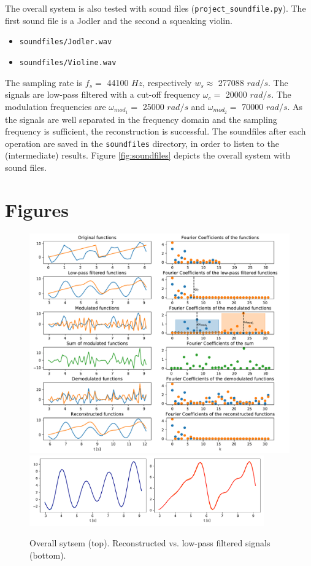 \documentclass[12pt, a4paper]{report}
\begin{document}
The overall system is also tested with sound files (\texttt{project\_soundfile.py}).
The first sound file is a Jodler and the second a squeaking violin.
\begin{itemize}
	\item \texttt{soundfiles/Jodler.wav}
	\item \texttt{soundfiles/Violine.wav}
\end{itemize}
The sampling rate is \(f_s=\) 44100 \(Hz\), respectively \(w_s\approx\) 277088 \(rad/s\).
The signals are low-pass filtered with a cut-off frequency \(\omega_c=\) 20000 \(rad/s\).
The modulation frequencies are \(\omega_{mod_1}=\) 25000 \(rad/s\) and \(\omega_{mod_2}=\) 70000 \(rad/s\).
As the signals are well separated in the frequency domain
and the sampling frequency is sufficient,
the reconstruction is successful.
The soundfiles after each operation are saved in the \texttt{soundfiles} directory,
in order to listen to the (intermediate) results.
Figure \ref{fig:soundfiles} depicts the overall system with sound files.

\appendix

\chapter{Figures}

\begin{figure}[h!]
	\centering
	\includegraphics[width=\textwidth]{figures/overall_sampling.pdf}
	\includegraphics[width=0.9\textwidth]{figures/sampling_cmp.pdf}
	\caption{Overall sytsem (top). Reconstructed vs. low-pass filtered signals (bottom).}
	\label{fig:overall}
\end{figure}
\end{document}
